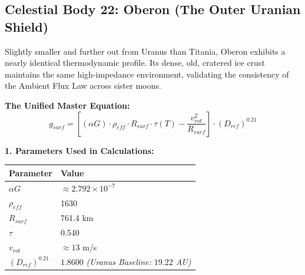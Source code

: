 \documentclass[11pt, a4paper]{article}
\begin{document}
\clearpage
\subsection{Celestial Body 22: Oberon (The Outer Uranian Shield)}
  Slightly smaller and further out from Uranus than Titania, Oberon exhibits a nearly identical thermodynamic profile. Its dense, old, cratered ice crust maintains the same high-impedance environment, validating the consistency of the Ambient Flux Law across sister moons.

  \vspace{0.5em}
  \noindent \textbf{The Unified Master Equation:}
  $$ g_{surf} = \left[ (\alpha G) \cdot \rho_{eff} \cdot R_{surf} \cdot \tau(T) - \frac{v_{rot}^2}{R_{surf}} \right] \cdot (D_{ref})^{0.21} $$

  \vspace{0.5em}
  \noindent \textbf{1. Parameters Used in Calculations:} \\[0.5em]
  \begingroup
  \renewcommand{\arraystretch}{1.3}
  \hspace*{2em}
  \begin{tabular}{|l|l|}
    \hline
    \textbf{Parameter} & \textbf{Value} \\ \hline
    $\alpha G$ & $\approx 2.792 \times 10^{-7}$ \\ \hline
    $\rho_{eff}$ & 1630 \\ \hline
    $R_{surf}$ & 761.4 km \\ \hline
    $\tau$ & 0.540 \\ \hline
    $v_{rot}$ & $\approx 13$ m/s \\ \hline
    $(D_{ref})^{0.21}$ & $1.8600$ \textit{(Uranus Baseline: $19.22$ AU)} \\ \hline
  \end{tabular}
  \endgroup
\end{document}
